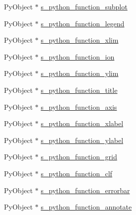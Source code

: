 \begin{DoxyCompactItemize}
\item 
Py\+Object $\ast$ \mbox{\hyperlink{structmatplotlibcpp_1_1detail_1_1__interpreter_ac7d8c33ba71612dd19572014c952c7db}{s\+\_\+python\+\_\+function\+\_\+subplot}}
\item 
Py\+Object $\ast$ \mbox{\hyperlink{structmatplotlibcpp_1_1detail_1_1__interpreter_a28c5ce55339fd939a1a7e00cb8186f1d}{s\+\_\+python\+\_\+function\+\_\+legend}}
\item 
Py\+Object $\ast$ \mbox{\hyperlink{structmatplotlibcpp_1_1detail_1_1__interpreter_a078b733c5d391a091049b6ef00488b38}{s\+\_\+python\+\_\+function\+\_\+xlim}}
\item 
Py\+Object $\ast$ \mbox{\hyperlink{structmatplotlibcpp_1_1detail_1_1__interpreter_ace1bd6a5906a7f74cc1b38ebe24b8b65}{s\+\_\+python\+\_\+function\+\_\+ion}}
\item 
Py\+Object $\ast$ \mbox{\hyperlink{structmatplotlibcpp_1_1detail_1_1__interpreter_afa69df018d0a76c3525693f09197176f}{s\+\_\+python\+\_\+function\+\_\+ylim}}
\item 
Py\+Object $\ast$ \mbox{\hyperlink{structmatplotlibcpp_1_1detail_1_1__interpreter_a74fae3504387acebd6c1515ba10c0c75}{s\+\_\+python\+\_\+function\+\_\+title}}
\item 
Py\+Object $\ast$ \mbox{\hyperlink{structmatplotlibcpp_1_1detail_1_1__interpreter_a56892306d24918fbe5eaeade997bb611}{s\+\_\+python\+\_\+function\+\_\+axis}}
\item 
Py\+Object $\ast$ \mbox{\hyperlink{structmatplotlibcpp_1_1detail_1_1__interpreter_a25279a4bc59b40e4f48c7491c6ec5af3}{s\+\_\+python\+\_\+function\+\_\+xlabel}}
\item 
Py\+Object $\ast$ \mbox{\hyperlink{structmatplotlibcpp_1_1detail_1_1__interpreter_aa90a8153eb9c50bf42a26ea1689fbf19}{s\+\_\+python\+\_\+function\+\_\+ylabel}}
\item 
Py\+Object $\ast$ \mbox{\hyperlink{structmatplotlibcpp_1_1detail_1_1__interpreter_a38630747267b258d93229eaea64610eb}{s\+\_\+python\+\_\+function\+\_\+grid}}
\item 
Py\+Object $\ast$ \mbox{\hyperlink{structmatplotlibcpp_1_1detail_1_1__interpreter_a072f6b7a261385e68f773c3f74622d96}{s\+\_\+python\+\_\+function\+\_\+clf}}
\item 
Py\+Object $\ast$ \mbox{\hyperlink{structmatplotlibcpp_1_1detail_1_1__interpreter_a082b7b746d5ebe138b1a136944d0a4ca}{s\+\_\+python\+\_\+function\+\_\+errorbar}}
\item 
Py\+Object $\ast$ \mbox{\hyperlink{structmatplotlibcpp_1_1detail_1_1__interpreter_af63d49cff0820f3324b12da812c9a266}{s\+\_\+python\+\_\+function\+\_\+annotate}}

\end{DoxyCompactItemize}
